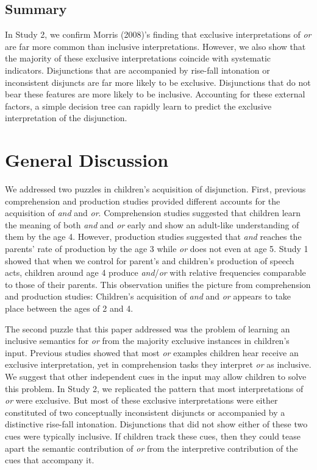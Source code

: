 \documentclass[10pt, letterpaper]{article}
\begin{document}
\subsection{Summary}\label{summary}

In Study 2, we confirm Morris (2008)'s finding that exclusive
interpretations of \emph{or} are far more common than inclusive
interpretations. However, we also show that the majority of these
exclusive interpretations coincide with systematic indicators.
Disjunctions that are accompanied by rise-fall intonation or
inconsistent disjuncts are far more likely to be exclusive. Disjunctions
that do not bear these features are more likely to be inclusive.
Accounting for these external factors, a simple decision tree can
rapidly learn to predict the exclusive interpretation of the
disjunction.

\section{General Discussion}\label{general-discussion}

We addressed two puzzles in children's acquisition of disjunction.
First, previous comprehension and production studies provided different
accounts for the acquisition of \emph{and} and \emph{or}. Comprehension
studies suggested that children learn the meaning of both \emph{and} and
\emph{or} early and show an adult-like understanding of them by the age
4. However, production studies suggested that \emph{and} reaches the
parents' rate of production by the age 3 while \emph{or} does not even
at age 5. Study 1 showed that when we control for parent's and
children's production of speech acts, children around age 4 produce
\emph{and}/\emph{or} with relative frequencies comparable to those of
their parents. This observation unifies the picture from comprehension
and production studies: Children's acquisition of \emph{and} and
\emph{or} appears to take place between the ages of 2 and 4.

The second puzzle that this paper addressed was the problem of learning
an inclusive semantics for \emph{or} from the majority exclusive
instances in children's input. Previous studies showed that most
\emph{or} examples children hear receive an exclusive interpretation,
yet in comprehension tasks they interpret \emph{or} as inclusive. We
suggest that other independent cues in the input may allow children to
solve this problem. In Study 2, we replicated the pattern that most
interpretations of \emph{or} were exclusive. But most of these exclusive
interpretations were either constituted of two conceptually inconsistent
disjuncts or accompanied by a distinctive rise-fall intonation.
Disjunctions that did not show either of these two cues were typically
inclusive. If children track these cues, then they could tease apart the
semantic contribution of \emph{or} from the interpretive contribution of
the cues that accompany it.
\end{document}
